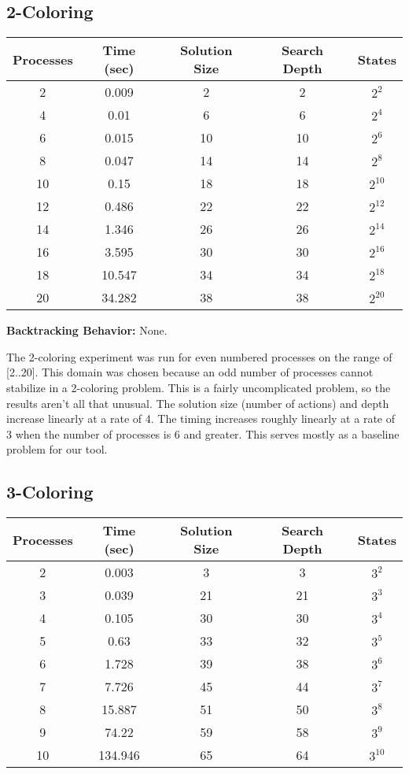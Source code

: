 \subsection{2-Coloring}
\begin{center}
\begin{tabular}{|c|c|c|c|c|}
\hline
 Processes & Time (sec) & Solution Size & Search Depth & States \\
\hline
 2 & 0.009 & 2 & 2 & $2^{2}$             \\
 4 & 0.01 & 6 & 6 & $2^{4}$              \\
 6 & 0.015 & 10 & 10 & $2^{6}$           \\
 8 & 0.047 & 14 & 14 & $2^{8}$           \\
 10 & 0.15 & 18 & 18 & $2^{10}$          \\
 12 & 0.486 & 22 & 22 & $2^{12}$         \\
 14 & 1.346 & 26 & 26 & $2^{14}$        \\
 16 & 3.595 & 30 & 30 & $2^{16}$        \\
 18 & 10.547 & 34 & 34 & $2^{18}$       \\
 20 & 34.282 & 38 & 38 & $2^{20}$       \\
\hline
\end{tabular}
\end{center}

{\bf Backtracking Behavior:} None.

The 2-coloring experiment was run for even numbered processes on the range of [2..20].  This domain was chosen because an odd number of processes
cannot stabilize in a 2-coloring problem.  This is a fairly uncomplicated problem, so the results aren't all that unusual.
The solution size (number of actions) and depth increase linearly at a rate of 4.
The timing increases roughly linearly at a rate of 3 when the number of processes is 6 and greater.
This serves mostly as a baseline problem for our tool.

\subsection{3-Coloring}
\begin{center}
\begin{tabular}{|c|c|c|c|c|}
\hline
 Processes & Time (sec) & Solution Size & Search Depth & States \\
\hline
 2 & 0.003 & 3 & 3 & $3^{2}$           \\
 3 & 0.039 & 21 & 21 & $3^{3}$         \\
 4 & 0.105 & 30 & 30 & $3^{4}$          \\
 5 & 0.63 & 33 & 32 & $3^{5}$          \\
 6 & 1.728 & 39 & 38 & $3^{6}$        \\
 7 & 7.726 & 45 & 44 & $3^{7}$        \\
 8 & 15.887 & 51 & 50 & $3^{8}$       \\
 9 & 74.22 & 59 & 58 & $3^{9}$        \\
 10 & 134.946 & 65 & 64 & $3^{10}$    \\
\hline
\end{tabular}
\end{center}

